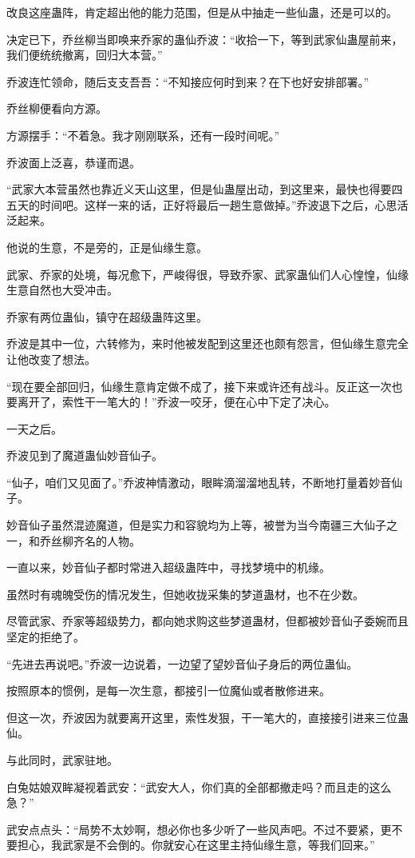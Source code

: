 \begin{this_body}
改良这座蛊阵，肯定超出他的能力范围，但是从中抽走一些仙蛊，还是可以的。

决定已下，乔丝柳当即唤来乔家的蛊仙乔波：“收拾一下，等到武家仙蛊屋前来，我们便统统撤离，回归大本营。”

乔波连忙领命，随后支支吾吾：“不知接应何时到来？在下也好安排部署。”

乔丝柳便看向方源。

方源摆手：“不着急。我才刚刚联系，还有一段时间呢。”

乔波面上泛喜，恭谨而退。

“武家大本营虽然也靠近义天山这里，但是仙蛊屋出动，到这里来，最快也得要四五天的时间吧。这样一来的话，正好将最后一趟生意做掉。”乔波退下之后，心思活泛起来。

他说的生意，不是旁的，正是仙缘生意。

武家、乔家的处境，每况愈下，严峻得很，导致乔家、武家蛊仙们人心惶惶，仙缘生意自然也大受冲击。

乔家有两位蛊仙，镇守在超级蛊阵这里。

乔波是其中一位，六转修为，来时他被发配到这里还也颇有怨言，但仙缘生意完全让他改变了想法。

“现在要全部回归，仙缘生意肯定做不成了，接下来或许还有战斗。反正这一次也要离开了，索性干一笔大的！”乔波一咬牙，便在心中下定了决心。

一天之后。

乔波见到了魔道蛊仙妙音仙子。

“仙子，咱们又见面了。”乔波神情激动，眼眸滴溜溜地乱转，不断地打量着妙音仙子。

妙音仙子虽然混迹魔道，但是实力和容貌均为上等，被誉为当今南疆三大仙子之一，和乔丝柳齐名的人物。

一直以来，妙音仙子都时常进入超级蛊阵中，寻找梦境中的机缘。

虽然时有魂魄受伤的情况发生，但她收拢采集的梦道蛊材，也不在少数。

尽管武家、乔家等超级势力，都向她求购这些梦道蛊材，但都被妙音仙子委婉而且坚定的拒绝了。

“先进去再说吧。”乔波一边说着，一边望了望妙音仙子身后的两位蛊仙。

按照原本的惯例，是每一次生意，都接引一位魔仙或者散修进来。

但这一次，乔波因为就要离开这里，索性发狠，干一笔大的，直接接引进来三位蛊仙。

与此同时，武家驻地。

白兔姑娘双眸凝视着武安：“武安大人，你们真的全部都撤走吗？而且走的这么急？”

武安点点头：“局势不太妙啊，想必你也多少听了一些风声吧。不过不要紧，更不要担心，我武家是不会倒的。你就安心在这里主持仙缘生意，等我们回来。”


\end{this_body}
